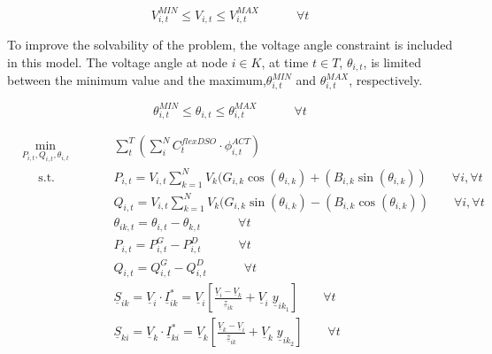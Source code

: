 \begin{equation*}
V_{i,t}^{MIN} \leq V_{i,t} \leq V_{i,t}^{MAX}  \quad   \qquad  \forall t 
\end{equation*}

To improve the solvability of the problem, the voltage angle constraint is included in this model. The voltage angle at node $i \in K$, at time $t \in T$, $\theta_{i,t}$, is limited between the minimum value and the maximum,$\theta_{i,t}^{MIN}$ and $\theta_{i,t}^{MAX}$, respectively.

\begin{equation*}
 \theta_{i,t}^{MIN} \leq \theta_{i,t}  \leq \theta_{i,t}^{MAX} \quad   \qquad  \forall t 
\end{equation*}


\begin{subequations}
\begin{alignat}{2}
&\!\min_{P_{i,t}, Q_{i,t}, \theta_{i,t}}  &\qquad& \sum_{t}^{T} \left( \sum_{i}^{N} C_t^{flexDSO} \cdot \phi_{i,t}^{ACT} \right) \label{eq:optProb}\\ 
&\phantom{Mi} \text{s.t.} &      & P_{i,t} = V_{i,t} \sum_{k=1}^{N} V_{k} (G_{i,k} \cos(\theta_{i,k}) + (B_{i,k} \sin(\theta_{i,k})) \qquad \forall i,\forall t \label{eq:activepowernodalbalance} \\ 
&				   &      & Q_{i,t} = V_{i,t} \sum_{k=1}^{N} V_{k} (G_{i,k} \sin(\theta_{i,k}) - (B_{i,k} \cos(\theta_{i,k})) \qquad \forall i,\forall t \label{eq:reactivepowernodalbalance} \\
&                  &      & \theta_{ik,t} = \theta_{i,t} - \theta_{k,t} \quad   \qquad  \forall t  \label{eq:voltageangle} \\
&                  &      & P_{i,t} = P_{i,t}^{G} - P_{i,t}^{D}  \quad   \qquad  \forall t  \label{eq:Pi} \\
&                  &      & Q_{i,t} = Q_{i,t}^{G} - Q_{i,t}^{D}  \quad   \qquad  \forall t  \label{eq:Qi} \\
&                  &      & \underline{S}_{ik} = \underline{V}_{i} \cdot \underline{I}_{ik}^{*} = \underline{V}_{i} \left[ \frac{\underline{V}_{i} - \underline{V}_{k}}{\underline{z}_{ik}} + \underline{V}_{i} \; \underline{y}_{ik_1} \right]   \qquad  \forall t  \label{eq:apparentflowlineik} \\
&                  &      & \underline{S}_{ki} = \underline{V}_{k} \cdot \underline{I}_{ki}^{*} = \underline{V}_{k} \left[ \frac{\underline{V}_{k} - \underline{V}_{i}}{\underline{z}_{ik}} + \underline{V}_{k} \;  \underline{y}_{ik_2} \right]   \qquad  \forall t  \label{eq:apparentflowlineki} \\

\end{alignat}
\end{subequations}
